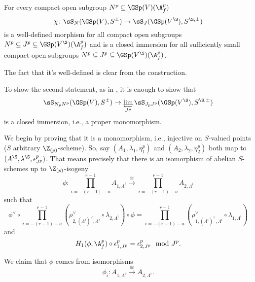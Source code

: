 \documentclass[a4paper]{scrartcl} %
\numberwithin{equation}{section}
\begin{document}
\begin{Proposition}\label{diag-emb}
  For every compact open subgroup $N^p\subseteq \GSp(V)(\A_f^p)$
  \begin{equation*}
    \chi\colon\sS_N(\GSp(V),S^\pm) \to \sS_J(\GSp(V^\S),S^{\S,\pm})
  \end{equation*}
  is a well-defined morphism for all compact open subgroups $N^p\subseteq J^p\subseteq \GSp(V^\S)(\A_f^p)$ and is a closed immersion for all sufficiently small compact open subgroups $N^p\subseteq J^p\subseteq \GSp(V^\S)(\A_f^p)$.
\end{Proposition}

\begin{Proof}
  The fact that it's well-defined is clear from the construction.

  To show the second statement, as in \cite[Prop.~1.15]{travaux}, it is enough to show that
  \begin{equation*}
    \sS_{N_pN^p}(\GSp(V),S^\pm) \to \varprojlim_{J^p}\sS_{J_pJ^p}(\GSp(V^\S),S^{\S,\pm})
  \end{equation*}
  is a closed immersion, i.e., a proper monomorphism.

  We begin by proving that it is a monomorphism, i.e., injective on $S$-valued points ($S$ arbitrary $\Z_{(p)}$-scheme). So, say $(A_1,\lambda_1,\eta_1^p)$ and $(A_2,\lambda_2,\eta_2^p)$ both map to $(A^\S,\lambda^\S,\epsilon_{J^p}^p)$. That means precisely that there is an isomorphism of abelian $S$-schemes up to $\Z_{(p)}$-isogeny
  \begin{equation*}
    \phi\colon \prod_{i=-(r-1)-a}^{r-1}A_{1,\Lambda^i} \xrightarrow{\cong} \prod_{i=-(r-1)-a}^{r-1}A_{2,\Lambda^i}
  \end{equation*}
  such that
  \begin{equation*}
    \phi^\vee \circ \prod_{i=-(r-1)-a}^{r-1}\left(\rho_{2,\left(\Lambda^i\right)^\vee,\Lambda^i}^\vee\circ \lambda_{2,\Lambda^i}\right) \circ \phi = \prod_{i=-(r-1)-a}^{r-1}\left(\rho_{1,\left(\Lambda^i\right)^\vee,\Lambda^i}^\vee\circ \lambda_{1,\Lambda^i}\right)
  \end{equation*}
  and
  \begin{equation*}
    H_1(\phi,\A_f^p)\circ \epsilon_{1,J^p}^p = \epsilon_{2,J^p}^p   \mod{J^p}.
  \end{equation*}

  We claim that $\phi$ comes from isomorphisms
  \begin{equation*}
    \phi_i\colon A_{1,\Lambda^i} \xrightarrow{\cong} A_{2,\Lambda^i}.
  \end{equation*}


\end{Proof}
\end{document}
